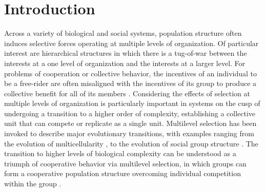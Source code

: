 \documentclass[11pt]{article}
\numberwithin{equation}{section}
\newcommand{\myindent}{\hspace{10mm}}
\begin{document}
{\hypersetup{linkbordercolor=black, linkcolor = black}
\begin{spacing}{0.01}
\renewcommand{\baselinestretch}{0.1}\normalsize
\tableofcontents
{}
\end{spacing}
\singlespacing

\section{Introduction}

\myindent Across a variety of biological and social systems, population structure often induces selective forces operating at multiple levels of organization. Of particular interest are hierarchical structures in which there is a tug-of-war between the interests at a one level of organization and the interests at a larger level. For problems of cooperation or collective behavior, the incentives of an individual to be a free-rider are often misaligned with the incentives of its group to produce a collective benefit for all of its members \cite{levin2010crossing}. Considering the effects of selection at multiple levels of organization is particularly important in systems on the cusp of undergoing a transition to a higher order of complexity, establishing a collective unit that can compete or replicate as a single unit. Multilevel selection has been invoked to describe major evolutionary transitions, with examples ranging from the evolution of multicellularity \cite{rainey2003evolution,tarnita2013evolutionary,rose2020meta,pichugin2015modes,pichugin2018reproduction,staps2019emergence}, to the evolution of social group structure \cite{nowak2010evolution,fu2015risk}. The transition to higher levels of biological complexity can be understood as a triumph of cooperative behavior via multilevel selection, in which groups can form a cooperative population structure overcoming individual competition within the group \cite{szathmary1995major,nowak2006five,taylor2007transforming}.

}
\end{document}
